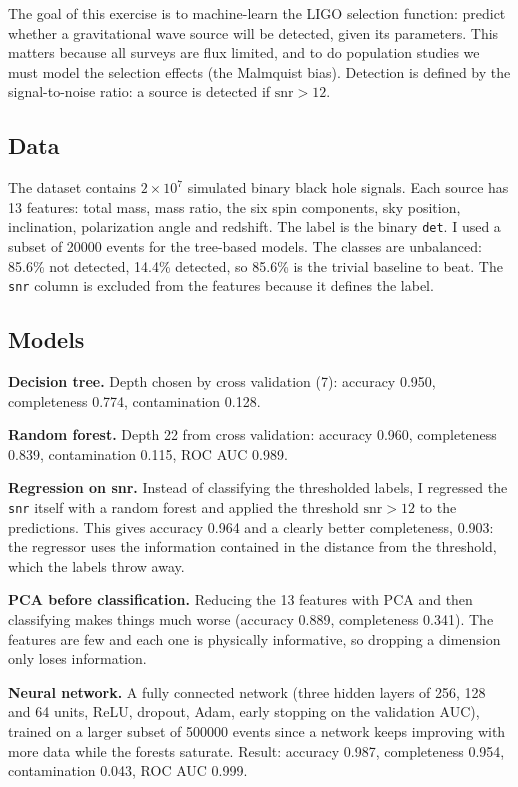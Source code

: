 \documentclass[11pt]{article}
\begin{document}
The goal of this exercise is to machine-learn the LIGO selection function: predict whether a gravitational wave source will be detected, given its parameters. This matters because all surveys are flux limited, and to do population studies we must model the selection effects (the Malmquist bias). Detection is defined by the signal-to-noise ratio: a source is detected if $\mathrm{snr} > 12$.

\subsection*{Data}

The dataset contains $2\times10^7$ simulated binary black hole signals. Each source has 13 features: total mass, mass ratio, the six spin components, sky position, inclination, polarization angle and redshift. The label is the binary \texttt{det}. I used a subset of 20000 events for the tree-based models. The classes are unbalanced: 85.6\% not detected, 14.4\% detected, so 85.6\% is the trivial baseline to beat. The \texttt{snr} column is excluded from the features because it defines the label.

\subsection*{Models}

\textbf{Decision tree.} Depth chosen by cross validation (7): accuracy 0.950, completeness 0.774, contamination 0.128.

\textbf{Random forest.} Depth 22 from cross validation: accuracy 0.960, completeness 0.839, contamination 0.115, ROC AUC 0.989.

\textbf{Regression on snr.} Instead of classifying the thresholded labels, I regressed the \texttt{snr} itself with a random forest and applied the threshold $\mathrm{snr}>12$ to the predictions. This gives accuracy 0.964 and a clearly better completeness, 0.903: the regressor uses the information contained in the distance from the threshold, which the labels throw away.

\textbf{PCA before classification.} Reducing the 13 features with PCA and then classifying makes things much worse (accuracy 0.889, completeness 0.341). The features are few and each one is physically informative, so dropping a dimension only loses information.

\textbf{Neural network.} A fully connected network (three hidden layers of 256, 128 and 64 units, ReLU, dropout, Adam, early stopping on the validation AUC), trained on a larger subset of 500000 events since a network keeps improving with more data while the forests saturate. Result: accuracy 0.987, completeness 0.954, contamination 0.043, ROC AUC 0.999.
\end{document}
